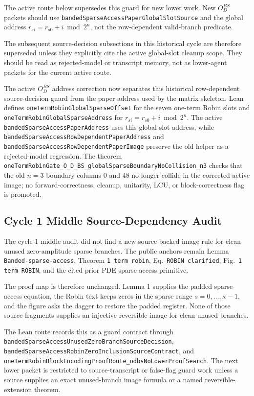 The active route below supersedes this guard for new lower work.  New
\(O_D^{BS}\) packets should use
\texttt{bandedSparseAccessPaperGlobalSlotSource} and the global address
\(r_{si}=r_{s0}+i \bmod 2^n\), not the row-dependent valid-branch predicate.

The subsequent source-decision subsections in this historical cycle are
therefore superseded unless they explicitly cite the active global-slot
cleanup scope.  They should be read as rejected-model or transcript memory,
not as lower-agent packets for the current active route.

The active \(O_D^{BS}\) address correction now separates this historical
row-dependent source-decision guard from the paper address used by the matrix
skeleton.  Lean defines \texttt{oneTermRobinGlobalSparseOffset} for the seven
one-term Robin slots and
\texttt{oneTermRobinGlobalSparseAddress} for
\(r_{si}=r_{s0}+i \bmod 2^n\).  The active
\texttt{bandedSparseAccessPaperAddress} uses this global-slot address, while
\texttt{bandedSparseAccessRowDependentPaperAddress} and
\texttt{bandedSparseAccessRowDependentPaperImage} preserve the old helper as a
rejected-model regression.  The theorem
\texttt{oneTermRobinGate\_O\_D\_BS\_globalSparseBoundaryNoCollision\_n3}
checks that the old \(n=3\) boundary columns \(0\) and \(48\) no longer collide
in the corrected active image; no forward-correctness, cleanup, unitarity, LCU,
or block-correctness flag is promoted.

\subsection{Cycle 1 Middle Source-Dependency Audit}

The cycle-1 middle audit did not find a new source-backed image rule for clean
unused zero-amplitude sparse branches.  The public anchors remain Lemma
\texttt{Banded-sparse-access}, Theorem \texttt{1 term robin}, Eq.\
\texttt{ROBIN clarified}, Fig.\ \texttt{1 term ROBIN}, and the cited prior PDE
sparse-access primitive.

The proof map is therefore unchanged.  Lemma 1 supplies the padded
sparse-access equation, the Robin text keeps zeros in the sparse range
\(s=0,\ldots,\kappa-1\), and the figure asks the dagger to restore the padded
register.  None of those source fragments supplies an injective reversible
image for clean unused branches.

The Lean route records this as a guard contract through
\texttt{bandedSparseAccessUnusedZeroBranchSourceDecision},
\texttt{bandedSparseAccessRobinZeroInclusionSourceContract}, and
\texttt{oneTermRobinBlockEncodingProofRoute\_odbsNoLowerProofSearch}.  The
next lower packet is restricted to source-transcript or false-flag guard work
unless a source supplies an exact unused-branch image formula or a named
reversible-extension theorem.

